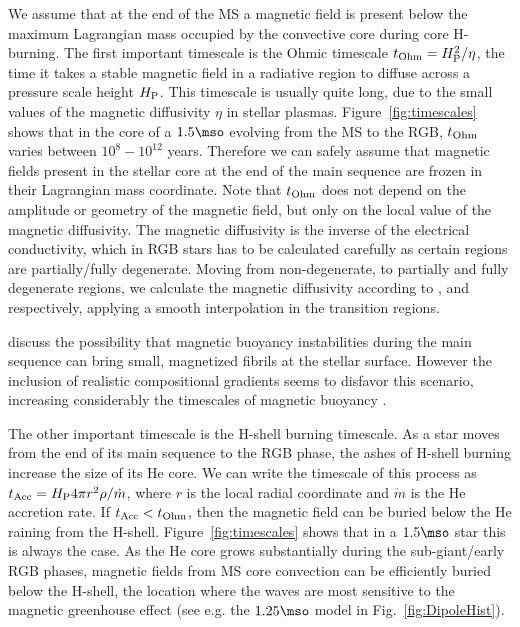 We assume that at the end of the MS a magnetic field is present below the maximum Lagrangian mass occupied by the convective core during core H-burning.
The first important timescale is the Ohmic timescale $t_{\rm Ohm}= H_{\rm P}^2/\eta$, the time it takes a stable magnetic field in a radiative region to diffuse across a pressure scale height $H_{\rm P}$. This timescale is usually quite long, due to the small values of the magnetic diffusivity $\eta$ in stellar plasmas. Figure~\ref{fig:timescales} shows that in the core of a $1.5\mso$ evolving from the MS to the RGB, $t_{\rm Ohm}$ varies between $10^8-10^{12}$ years. Therefore we can safely assume that magnetic fields present in the stellar core at the end of the main sequence are frozen in their Lagrangian mass coordinate.
Note that  $t_{\rm Ohm}$ does not depend on the amplitude or geometry of the magnetic field, but only on the local value of the magnetic diffusivity. The magnetic diffusivity is the inverse of the electrical conductivity,  which in RGB stars has to be calculated carefully as certain regions are partially/fully degenerate. Moving from non-degenerate, to partially and fully degenerate regions, we calculate the magnetic diffusivity according to \cite{1968dms..book.....S}, \cite{1987ApJ...313..284W} and \cite{1984MNRAS.209..511N} respectively, applying a smooth interpolation in the transition regions.

\citet{MacGregor_2003} discuss the possibility that magnetic buoyancy instabilities during the main sequence can bring small, magnetized fibrils at the stellar surface. However the inclusion of realistic compositional gradients seems to disfavor this scenario, increasing considerably the timescales of magnetic buoyancy \citep{MacDonald_2004}.

The other important timescale is the H-shell burning timescale. As a star moves from the end of its main sequence to the RGB phase, the ashes of H-shell burning increase the size of its He core. We can write the timescale of this process as $t_{\rm Acc} = H_{\rm P} 4\pi r^2 \rho / \dot{m}$, where $r$ is the local radial coordinate and $\dot{m}$ is the He accretion rate. If $t_{\rm Acc} < t_{\rm Ohm}$, then the magnetic field can be buried below the He raining from the H-shell. Figure~\ref{fig:timescales} shows that in a $1.5\mso$ star this is always the case. As the He core grows substantially during the sub-giant/early RGB phases, magnetic fields from MS core convection can be efficiently buried below the H-shell, the location where the waves are most sensitive to the magnetic greenhouse effect (see e.g. the $1.25\mso$ model in Fig.~\ref{fig:DipoleHist}).


